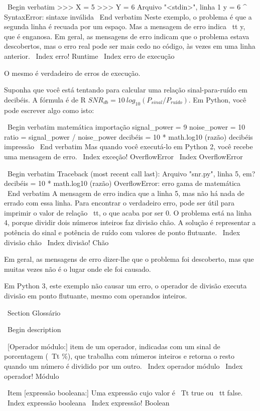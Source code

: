 \documentclass[10pt]{book}
\begin{document}
{{{\ Begin {verbatim}
>>> X = 5
>>> Y = 6
  Arquivo "<stdin>", linha 1
    y = 6
    ^
SyntaxError: sintaxe inválida
\ End {verbatim}
%
Neste exemplo, o problema é que a segunda linha é recuada por
um espaço. Mas a mensagem de erro indica {\ tt y}, que é
enganosa. Em geral, as mensagens de erro indicam que o problema estava
descobertos, mas o erro real pode ser mais cedo no código,
às vezes em uma linha anterior.
\ Index {erro! Runtime}
\ Index {erro de execução}

O mesmo é verdadeiro de erros de execução.  

Suponha que você está tentando
para calcular uma relação sinal-para-ruído em decibéis. A fórmula
é de R $ SNR_ {db} = 10 \ log_ {10} (P_ {sinal} / P_ {ruído}) $. Em Python,
você pode escrever algo como isto:

\ Begin {verbatim}
matemática importação
signal_power = 9
noise_power = 10
ratio = signal_power / noise_power
decibéis = 10 * math.log10 (razão)
decibéis impressão
\ End {verbatim}
%
Mas quando você executá-lo em Python 2, você recebe uma mensagem de erro.
\ Index {exceção! OverflowError}
\ Index {} OverflowError

\ Begin {verbatim}
Traceback (most recent call last):
  Arquivo "snr.py", linha 5, em?
    decibéis = 10 * math.log10 (razão)
OverflowError: erro gama de matemática
\ End {verbatim}
%
A mensagem de erro indica que a linha 5, mas não há nada
de errado com essa linha. Para encontrar o verdadeiro erro, pode ser
útil para imprimir o valor de {relação \ tt}, o que acaba por
ser 0. O problema está na linha 4, porque dividir dois números inteiros
faz divisão chão. A solução é representar a potência do sinal
e potência de ruído com valores de ponto flutuante.
\ Index {divisão chão}
\ Index {divisão! Chão}

Em geral, as mensagens de erro dizer-lhe que o problema foi descoberto, 
mas que muitas vezes não é o lugar onde ele foi causado.

Em Python 3, este exemplo não causar um erro, o operador de divisão
executa divisão em ponto flutuante, mesmo com operandos inteiros.


\ Section {} Glossário

\ Begin {description}

\ [Operador módulo:] item de um operador, indicadas com um sinal de porcentagem
({\ Tt \%}), que trabalha com números inteiros e retorna o resto quando um
número é dividido por um outro.
\ Index {operador módulo}
\ Index {operador! Módulo}

\ Item [expressão booleana:] Uma expressão cujo valor é 
{\ Tt true} ou {\ tt false}.
\ Index {expressão booleana}
\ Index {expressão! Boolean}

}}}
\end{document}
